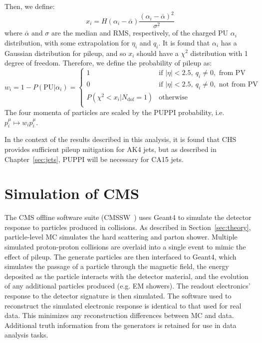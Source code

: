 Then, we define:
\begin{equation}
    x_i = H(\alpha_i - \bar\alpha) \frac{(\alpha_i - \bar\alpha)^2}{\sigma^2}
\end{equation}
where $\bar\alpha$ and $\sigma$ are the median and RMS, respectively, of the charged PU $\alpha_i$ distribution, with some extrapolation for $\eta_i$ and $q_i$.
It is found that $\alpha_i$ has a Gaussian distribution for pileup, and so $x_i$ should have a $\chi^2$ distribution with 1 degree of freedom.
Therefore, we define the probability of pileup as:
\begin{equation}
w_i = 1 - P(\mathrm{PU}|\alpha_i) = 
    \begin{cases}
        1 & \text{if }|\eta|<2.5,~q_i \neq 0, \text{ from PV} \\ 
        0 & \text{if }|\eta|<2.5,~q_i \neq 0, \text{ not from PV} \\ 
        P(\chi^2<x_i | N_\mathrm{dof}=1)  & \text{otherwise} \\ 
    \end{cases}
\end{equation}
The four momenta of particles are scaled by the PUPPI probability, i.e. $p_i^\mu \mapsto w_i p_i^\mu$.

In the context of the results described in this analysis, it is found that CHS provides sufficient pileup mitigation for AK4 jets, but as described in Chapter~\ref{sec:jets}, PUPPI will be necessary for CA15 jets. 

\section{Simulation of CMS}
\label{sec:cms:sim}

The CMS offline software suite (CMSSW~\cite{cmssw}) uses Geant4 \cite{geant1,geant2} to simulate the detector response to particles produced in collisions. 
As described in Section~\ref{sec:theory}, particle-level MC simulates the hard scattering and  parton shower.
Multiple simulated proton-proton collisions are overlaid into a single event to mimic the effect of pileup. 
The generate particles are then interfaced to Geant4, which simulates the passage of a particle through the magnetic field, the energy deposited as the particle interacts with the detector material, and the evolution of any additional particles produced (e.g. EM showers).
The readout electronics' response to the detector signature is then simulated.
The software used to reconstruct the simulated electronic response is identical to that used for real data.
This minimizes any reconstruction differences between MC and data.
Additional truth information from the generators is retained for use in data analysis tasks.

